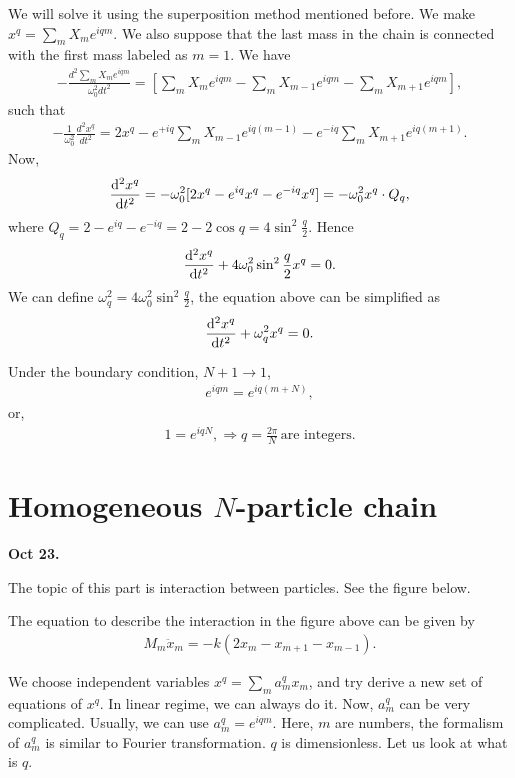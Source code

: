 We will solve it using the superposition method mentioned before. We make $ x^q=\sum_m X_m e^{iqm} $. We also suppose that the last mass in the chain is connected with the first mass labeled as $ m=1 $. We have
\begin{align}
-\frac{d^2 \sum_m X_m e^{iqm}}{\omega^2_0 dt^2}= [\sum_m X_m e^{iqm} - \sum_m X_{m-1} e^{iqm}- \sum_m X_{m+1}e^{iqm}],
\end{align}
such that
\begin{align}
-\frac{1}{\omega_0^2} \frac{d^2 x^q}{dt^2}= 2x^q - e^{+iq} \sum_m X_{m-1} e^{iq(m-1)}- e^{-iq} \sum_m X_{m+1} e^{iq(m+1)}.
\end{align}
Now, 
\begin{align}
\frac{{\mathrm d}^2 {x^q}}{{\mathrm d}t^2}=-\omega_0^2 [2x^q - e^{iq} x^q -e^{-iq} x^q]= -\omega_0^2 x^q \cdot Q_q,
\end{align}
where $Q_q= 2-e^{iq}- e^{-iq}=2-2\cos q=4\sin^2 \frac{q}{2}$. Hence
\begin{align}
\frac{{\mathrm d}^2 {x^q}}{{\mathrm d}t^2}+4\omega_0^2 \sin^2\frac{q}{2} x^q=0.
\end{align}
We can define $ \omega_q^2= 4\omega_0^2 \sin^2\frac{q}{2}$, the equation above can be simplified as
\begin{align}
\frac{{\mathrm d}^2 {x^q}}{{\mathrm d}t^2}+\omega_q^2 x^q=0.
\end{align}

Under the boundary condition, $ N+1\rightarrow 1 $, 
\begin{align}
e^{iqm}=e^{iq(m+N)},
\end{align}
or,
\begin{align}
1=e^{iqN},\Rightarrow q=\frac{2\pi}{N} \, \textrm{are integers.}
\end{align}

\section{Homogeneous $N$-particle chain}
\textbf{Oct 23.}

The topic of this part is interaction between particles. See the figure below. 

The equation to describe the interaction in the figure above can be given by
\begin{align}
M_m \ddot{x}_m =- k(2x_m-x_{m+1}-x_{m-1}).
\end{align}

We choose independent variables $ x^q=\sum_m a^q_m x_m $, and try derive a new set of equations of $ x^q $. In linear regime, we can always do it. Now, $ a^q_m $ can be very complicated. Usually, we can use $ a^q_m=e^{iqm} $. Here, $ m $ are numbers, the formalism of $ a^q_m $  is similar to Fourier transformation. $ q $ is dimensionless. Let us look at what is $ q $. 

